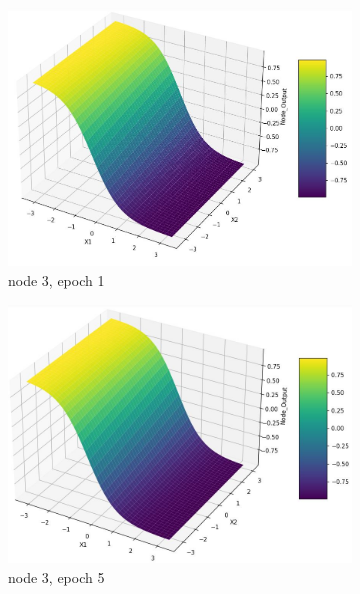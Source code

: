 \documentclass[11pt]{article}
\begin{document}
\begin{figure}[h]
\begin{subfigure}[b]{0.18\textwidth}
	\includegraphics[scale=0.14]{hidden1_n3_e1.jpg}
	\caption{node 3, epoch 1}
	\label{fig:fig2.1.4.11}
	\end{subfigure}
	\begin{subfigure}[b]{0.18\textwidth}
	\centering
	\includegraphics[scale=0.14]{hidden1_n3_e5.jpg}
	\caption{node 3, epoch 5}
	\label{fig:fig2.1.4.12}
	\end{subfigure}
	\begin{subfigure}[b]{0.18\textwidth}
	\centering

\end{subfigure}
\end{figure}
\end{document}
